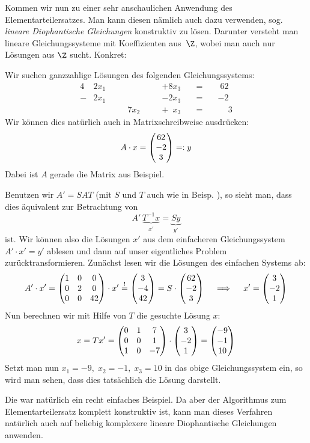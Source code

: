 Kommen wir nun zu einer sehr anschaulichen Anwendung des Elementarteilersatzes.
Man kann diesen nämlich auch dazu verwenden, sog. \emph{lineare Diophantische
Gleichungen} konstruktiv zu lösen. Darunter versteht man lineare
Gleichungssysteme mit Koeffizienten aus~$\Z$, wobei man auch nur Lösungen aus
$\Z$ sucht. Konkret:

\begin{thBeisp}
    Wir suchen ganzzahlige Lösungen des folgenden Gleichungssystems:
    \begin{alignat*}{4}
         &2x_1  &\quad&      &\quad&            +8x_3  &\quad=&\quad \; 62             \\
        -&2x_1  &\quad&      &\quad&            -2x_3  &\quad=&\quad            {-2}   \\
         &      &\quad& 7x_2 &\quad& +\phantom{1} x_3  &\quad=&\quad \phantom{+}  3
    \end{alignat*}
    Wir können dies natürlich auch in Matrixschreibweise ausdrücken:
    \[ A \cdot x = \begin{pmatrix} 62\\-2\\3 \end{pmatrix} =: y \]
    Dabei ist $A$ gerade die Matrix aus Beispiel. %
    
    Benutzen wir $A' = S\!AT$ (mit $S$ und $T$ auch wie in Beisp. %
    ), so sieht man, dass dies äquivalent zur Betrachtung von
    \[ A' \, \underbrace{ T^{-1} x }_{x'} = \underbrace{Sy}_{y'} \]
    ist. Wir können also die Lösungen $x'$ aus dem einfacheren Gleichungssystem
    $A' \cdot x' = y'$ ablesen und dann auf unser eigentliches Problem
    zurücktransformieren. Zunächst lesen wir die Lösungen des einfachen Systems
    ab:
    \[ A' \cdot x' = \begin{pmatrix} 
                 1 &  0 &   0 \\
                 0 &  2 &   0 \\
                 0 &  0 &  42   \end{pmatrix} \cdot x' \overset{!}{=}
       \begin{pmatrix} 3\\-4\\42 \end{pmatrix} 
       = S \cdot \begin{pmatrix} 62\\-2\\3 \end{pmatrix}
       \quad
       \implies
       \quad
       x' = \begin{pmatrix} 3\\-2\\1 \end{pmatrix}  \]
    Nun berechnen wir mit Hilfe von $T$ die gesuchte Lösung $x$:
    \[ x = T x' = 
            \begin{pmatrix} 
             0 &  1 &  7 \\
             0 &  0 &  1 \\
             1 &  0 & -7   \end{pmatrix} \cdot \begin{pmatrix} 3\\-2\\1 \end{pmatrix}
         = \begin{pmatrix} -9\\-1\\10 \end{pmatrix} \]
    Setzt man nun $x_1 = -9,\; x_2 = -1,\; x_3 = 10$ in das obige
    Gleichungssystem ein, so wird man sehen, dass dies tatsächlich die
    Lösung darstellt.
\end{thBeisp}

Die war natürlich ein recht einfaches Beispiel. Da aber der Algorithmus zum
Elementarteilersatz komplett konstruktiv ist, kann man dieses Verfahren
natürlich auch auf beliebig komplexere lineare Diophantische Gleichungen
anwenden.















